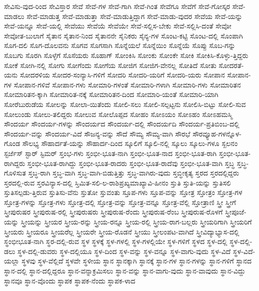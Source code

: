 {ಸೇವಿಸು-ವುದ-ರಿಂದ
ಸೇವಿಸ್ತಾರ
ಸೇವೆ
ಸೇವೆ-ಗಳ
ಸೇವೆ-ಗಾಗಿ
ಸೇವೆ-ಗಿಂತ
ಸೇವೆಗೂ
ಸೇವೆಗೆ
ಸೇವೆ-ಗೋಸ್ಕರ
ಸೇವೆ-ಮಾಡಲು
ಸೇವೆ-ಮಾಡುತ್ತ
ಸೇವೆ-ಮಾಡುತ್ತಾ
ಸೇವೆ-ಮಾಡುತ್ತಿದ್ದಾಗ
ಸೇವೆ-ಮಾಡು-ವುದರ
ಸೇವೆಯ
ಸೇವೆ-ಯನ್ನು
ಸೇವೆ-ಯನ್ನೂ
ಸೇವೆ-ಯಲ್ಲಿ
ಸೇವೆಯು
ಸೇವೆಯೆ
ಸೇವೆಯೇ
ಸೇವೆ-ಸಲ್ಲಿಸ-ಬೇಕು
ಸೇವೆ-ಸಲ್ಲಿಸಿ-ದಂತೆ
ಸೇವೋ
ಸೇವೋತ-ಬುಲಾಗೆ
ಸೈತಾನ
ಸೈತಾನ-ನಿಂದ
ಸೈತಾನನೇ
ಸೈನಿಕರು
ಸೈನ್ಯ-ಗಳ
ಸೊಂಟ-ಕಟ್ಟಿ
ಸೊಂಟ-ದಲ್ಲಿ
ಸೊಂಪಾಗಿ
ಸೊಗ-ದಲಿ
ಸೊಗ-ದೊಲವನು
ಸೊಗವ
ಸೊಗಸಾಗಿ
ಸೊನ್ನೆಯಲೆ
ಸೊನ್ನೆಯಿಂ
ಸೊನ್ನೆಯೆ
ಸೊಪ್ಪು
ಸೊಬ-ಗನ್ನು
ಸೊಬಗು
ಸೊರಗಿ
ಸೊಳ್ಳೆಗೆ
ಸೊಸೆಯರು
ಸೊಹಾಗ್
ಸೋಂಕಿಸಿ
ಸೋಂಕು
ಸೋಂಕೇ
ಸೋಕಿ
ಸೋಕಿಸಿ-ಕೊಳ್ಳು-ತ್ತಿದ್ದರು
ಸೋಕೆ
ಸೋಗಿ-ನಲ್ಲಿ
ಸೋಗು
ಸೋಗೆಂದು
ಸೋಗೆಯ
ಸೋಜಿಗ
ಸೋಜಿಗ-ವೇನಲ್ಲ
ಸೋತಿದೆ
ಸೋತು
ಸೋದರತೆ-ಯನು
ಸೋದರಳಿಯ
ಸೋದರ-ಸಂನ್ಯಾಸಿ-ಗಳಿಗೆ
ಸೋದರಿ
ಸೋದರಿ-ಯರಿಗೆ
ಸೋದರಿ-ಯರು
ಸೋಪಾನ
ಸೋಪಾನ-ಗಳ
ಸೋಪಾನ-ಗಳಿವೆ
ಸೋಪಾನ-ಗಳು
ಸೋಮಾರಿ-ಗಳಂತೆ
ಸೋಮಾರಿ-ಗಳಾಗಿ
ಸೋಮಾರಿ-ಗಳು
ಸೋಮಾರಿತನ
ಸೋಮಾರಿತನ-ಕ್ಕಾಗಿ
ಸೋಮಾರಿತ-ನಕ್ಕೆ
ಸೋಮಾರಿತನ-ದಿಂದ
ಸೋಮಾರಿ-ಯಂತೆ
ಸೋಮಾರಿ-ಯಾಗಿ
ಸೋರೆಬುರುಡೆಯ
ಸೋಲನ್ನು
ಸೋಲಾ-ಯಿತೆಂದು
ಸೋಲಿ-ಸಲು
ಸೋಲಿ-ಸಲ್ಪಟ್ಟನು
ಸೋಲಿಸಿ-ಬಿಟ್ಟು
ಸೋಲಿ-ಸುವ
ಸೋಲುಂಡು
ಸೋಲು-ತಲಿದ್ದರು
ಸೋಲುವ
ಸೋಲೊಪ್ಪದ
ಸೋಹಂ
ಸೋಽಯಂ
ಸೋಽಹಂ
ಸೋಽಹಮಸ್ಮಿ
ಸೌಂದರ್ಯ
ಸೌಂದರ್ಯ-ಗಳನ್ನು
ಸೌಂದರ್ಯದ
ಸೌಂದರ್ಯ-ದಲ್ಲಿ
ಸೌಂದರ್ಯದಿ
ಸೌಂದರ್ಯ-ಪ್ರತಿಬಿಂಬ-ದಲ್ಲಿ
ಸೌಂದರ್ಯ-ವನ್ನು
ಸೌಂದರ್ಯ-ವಿದೆ
ಸೌಜನ್ಯ-ವನ್ನು
ಸೌದೆ
ಸೌಮ್ಯ
ಸೌಮ್ಯ-ವಾಗಿ
ಸೌರಭೆ
ಸೌರವ್ಯೂಹ-ಗಳನ್ನೊಳ-ಗೊಂಡ
ಸೌಲಭ್ಯ
ಸೌಹಾರ್ದತೆ-ಯನ್ನು
ಸೌಹಾರ್ದ-ದಿಂದ
ಸ್ಕೂಲಿಗೆ
ಸ್ಕೂಲಿ-ನಲ್ಲಿ
ಸ್ಕೂಲು
ಸ್ಕೂಲು-ಗಳೂ
ಸ್ಖಲನಂ
ಸ್ಟರ್ಜೆಸ್
ಸ್ಟಾರ್
ಸ್ಟಿಮರ್
ಸ್ತಂಭ-ಗಳು
ಸ್ತಂಭೀ-ಭೂತ-ನಾಗಿ
ಸ್ತಂಭೀ-ಭೂತ-ನಾದ
ಸ್ತಂಭೀ-ಭೂತ-ರಾಗಿ
ಸ್ತಂಭೀ-ಭೂತ-ರಾಗಿದ್ದರು
ಸ್ತಂಭೀ-ಭೂತ-ರಾಗಿದ್ದು
ಸ್ತಂಭೀ-ಭೂತ-ರಾದರು
ಸ್ತಂಭೀ-ಭೂತ-ರಾದೆವು
ಸ್ತಂಭೀ-ಭೂತ-ವಾಗಿ
ಸ್ತಬ್ಧ
ಸ್ತಬ್ಧ-ಗೊಳಿಸುತ
ಸ್ತಬ್ಧ-ರಾಗಿ
ಸ್ತಬ್ಧ-ವಾಗಿ
ಸ್ತಬ್ಧ-ವಾಗಿ-ಬಿಡುತ್ತಿತ್ತು
ಸ್ತಬ್ಧ-ವಾಗಿರು-ವುದು
ಸ್ತಬ್ಧೀಕೃತ್ಯ
ಸ್ತರದ
ಸ್ತರದಲ್ಲಿದ್ದರು
ಸ್ತರದಲ್ಲಿ-ರುವ
ಸ್ತರವಿನ್ಯಾಸ-ದಲ್ಲಿ
ಸ್ತಿಮಿತ-ಸಲಿ-ಲ-ರಾಶಿಪ್ರಖ್ಯಮಾಖ್ಯಾವಿ-ಹೀನಂ
ಸ್ತುತಿ
ಸ್ತುತಿ-ಯನ್ನು
ಸ್ತುತಿಸಲಿ
ಸ್ತುತಿಸಲ್ಪಡು-ತ್ತಿರುವ
ಸ್ತುತಿಸು-ವೆನು
ಸ್ತುತೋ
ಸ್ತುವಂತು
ಸ್ತೂಪ-ಗಳು
ಸ್ತೂಪ-ವನ್ನು
ಸ್ತೋತ್ರ
ಸ್ತೋತ್ರಂ
ಸ್ತೋತ್ರ-ಗಳ
ಸ್ತೋತ್ರ-ಗಳನ್ನು
ಸ್ತೋತ್ರ-ಗಳು
ಸ್ತೋತ್ರ-ದಲ್ಲಿ
ಸ್ತೋತ್ರ-ವನ್ನು
ಸ್ತೋತ್ರ-ವನ್ನೂ
ಸ್ತೋತ್ರ-ವೆಲ್ಲಿ
ಸ್ತೋತ್ರಾಣಿ
ಸ್ತ್ರೀ
ಸ್ತ್ರೀಗೆ
ಸ್ತ್ರೀಪುರುಷರ
ಸ್ತ್ರೀಪುರುಷ-ರಲ್ಲಿ
ಸ್ತ್ರೀಪುರುಷರು
ಸ್ತ್ರೀಪುರುಷ-ರೆಂದು
ಸ್ತ್ರೀಪುರುಷ-ರೆಂಬ
ಸ್ತ್ರೀಪುರುಷ-ರೊಳಗೆ
ಸ್ತ್ರೀಪೂಜೆ-ಯನ್ನು
ಸ್ತ್ರೀಯನ್ನು
ಸ್ತ್ರೀಯರ
ಸ್ತ್ರೀಯ-ರನ್ನು
ಸ್ತ್ರೀಯ-ರನ್ನೂ
ಸ್ತ್ರೀಯ-ರಲ್ಲಿ
ಸ್ತ್ರೀಯ-ರಾಗ-ಬಲ್ಲರು
ಸ್ತ್ರೀಯರಿಗಾಗಿ
ಸ್ತ್ರೀಯರಿಗೆ
ಸ್ತ್ರೀಯರು
ಸ್ತ್ರೀಯರೂ
ಸ್ತ್ರೀಯರೆಲ್ಲ
ಸ್ತ್ರೀಯರೇ
ಸ್ತ್ರೀಯ-ರೊಡನೆ
ಸ್ತ್ರೀಯು
ಸ್ತ್ರೀಲಂಪಟ-ವಾಗಿದೆ
ಸ್ತ್ರೀವಿದ್ಯಾಭ್ಯಾಸ-ದಲ್ಲಿ
ಸ್ಥಂಭೀಭೂತ-ನಾಗಿ
ಸ್ಥರ-ದಲ್ಲಿ-ರುವ
ಸ್ಥಳ
ಸ್ಥಳಕ್ಕೆ
ಸ್ಥಳ-ಗಳಲ್ಲಿ
ಸ್ಥಳ-ಗಳಲ್ಲಿಯೇ
ಸ್ಥಳ-ಗಳಿಗೆ
ಸ್ಥಳದ
ಸ್ಥಳ-ದಲ್ಲಿ
ಸ್ಥಳ-ದಲ್ಲಿ-ಡಲು
ಸ್ಥಳ-ದಲ್ಲಿ-ಡುವರು
ಸ್ಥಳ-ದಲ್ಲಿಯೂ
ಸ್ಥಳ-ದಿಂದ
ಸ್ಥಳ-ವನ್ನು
ಸ್ಥಳ-ವನ್ನೂ
ಸ್ಥಳ-ವಾಗು-ವುದು
ಸ್ಥಳ-ವಿದೆ
ಸ್ಥಳ-ವಿದೆ-ಯಲ್ಲಾ
ಸ್ಥಳವು
ಸ್ಥಳ-ವೆಲ್ಲಿದೆ
ಸ್ಥಳವೇ
ಸ್ಥಳೀಯ
ಸ್ಥಾನ
ಸ್ಥಾನಕ್ಕಾಗಿ
ಸ್ಥಾನಕ್ಕೆ
ಸ್ಥಾನ-ಗಳ
ಸ್ಥಾನ-ಗಳನ್ನು
ಸ್ಥಾನ-ಗಳಿಗೆ
ಸ್ಥಾನದ
ಸ್ಥಾನ-ದಲ್ಲಿ
ಸ್ಥಾನ-ದಲ್ಲಿದ್ದರೂ
ಸ್ಥಾನ-ವನ್ನಾಕ್ರಮಿಸಲು
ಸ್ಥಾನ-ವನ್ನು
ಸ್ಥಾನ-ವಾಗು-ವುದು
ಸ್ಥಾನ-ವಾವುದು
ಸ್ಥಾನ-ವಿದ್ದು
ಸ್ಥಾನವೂ
ಸ್ಥಾನ-ವೊಂದು
ಸ್ಥಾಪಕ
ಸ್ಥಾಪಕ-ನೆಂದು
ಸ್ಥಾಪಕ-ಳಾದ
}
